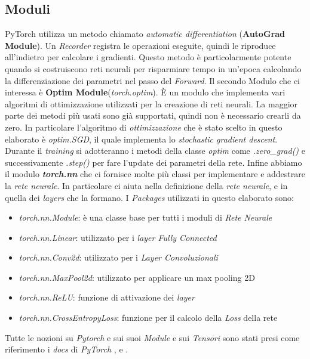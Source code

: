 \subsection{Moduli}
PyTorch utilizza un metodo chiamato \textit{automatic differentiation} (\textbf{AutoGrad Module}). Un \textit{Recorder} registra le operazioni eseguite, quindi le riproduce all'indietro per calcolare i gradienti. Questo metodo è particolarmente potente quando si costruiscono reti neurali per risparmiare tempo in un'epoca calcolando la differenziazione dei parametri nel passo del \textit{Forward}.
\newline
Il secondo Modulo che ci interessa è \textbf{Optim Module}(\textit{torch.optim}).
È un modulo che implementa vari algoritmi di ottimizzazione utilizzati per la creazione di reti neurali. La maggior parte dei metodi più usati sono già supportati, quindi non è necessario crearli da zero. In particolare l'algoritmo di \textit{ottimizzazione} che è stato scelto in questo elaborato è \textit{optim.SGD}, il quale implementa lo \textit{stochastic gradient descent}.
Durante il \textit{training} si adotteranno i metodi della classe \textit{optim} come \textit{ .zero\_grad()} e successivamente \textit{.step()} per fare l'update dei parametri della rete.
\newline
Infine abbiamo il modulo \textbf{\textit{torch.nn}} che ci fornisce molte più classi  per implementare e addestrare la \textit{rete neurale}. In particolare ci aiuta nella definizione della \textit{rete neurale}, e in quella dei \textit{layers} che la formano.
\newpage
I \textit{Packages} utilizzati in questo elaborato sono:
\begin{itemize}
    \item \textit{torch.nn.Module}: è una classe base per tutti i moduli di \textit{Rete Neurale}
    \item \textit{torch.nn.Linear}: utilizzato per i  \textit{layer Fully Connected}
    \item \textit{torch.nn.Conv2d}: utilizzato per i \textit{Layer Convoluzionali}
    \item \textit{torch.nn.MaxPool2d}: utilizzato per applicare un max pooling 2D 
    \item \textit{torch.nn.ReLU}: funzione di attivazione dei \textit{layer}
    \item \textit{torch.nn.CrossEntropyLoss}: funzione per il calcolo della \textit{Loss} della rete
\end{itemize}
Tutte le nozioni su \textit{Pytorch} e sui suoi \textit{Module} e  sui \textit{Tensori} sono stati presi come riferimento i \textit{docs} di \textit{PyTorch} \cite{pytorch}, \cite{pytorch_datasets} e \cite{pytorch_optim}.
